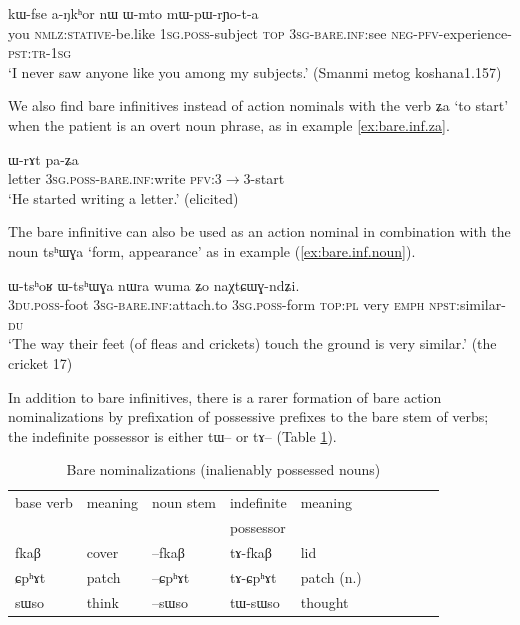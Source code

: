 \documentclass[oldfontcommands,oneside,a4paper,11pt]{article}
\newcommand{\ipa}[1]{{\phon \mbox{#1}}} %
\begin{document}
\begin{exe}
\ex \label{ex:bare.inf}
\gll \ipa{nɤʑo} 	\ipa{kɯ-fse} 	\ipa{a-ŋkʰor} 	\ipa{nɯ} 	\ipa{ɯ-mto} 	\ipa{mɯ-pɯ-rɲo-t-a} \\
you \textsc{nmlz:stative}-be.like \textsc{1sg.poss}-subject \textsc{top} \textsc{3sg}-\textsc{bare.inf:}see \textsc{neg-pfv}-experience-\textsc{pst:tr-1sg} \\
\glt  `I never saw anyone like you among my subjects.' (Smanmi metog koshana1.157)
\end{exe}

We also find bare infinitives instead of action nominals with the verb \ipa{ʑa} `to start' when the patient is an overt noun phrase, as in example \ref{ex:bare.inf.za}.

\begin{exe}
\ex \label{ex:bare.inf.za}
\gll \ipa{tɤscoz} 	\ipa{ɯ-rɤt} 	\ipa{pa-ʑa} 	  \\
letter \textsc{3sg.poss}-\textsc{bare.inf:}write \textsc{pfv:3$\rightarrow$3}-start\\
\glt  `He started writing a letter.' (elicited)
\end{exe}

 
The bare infinitive can also be used as an action nominal in combination with the noun \ipa{tsʰɯɣa} `form, appearance' as in example (\ref{ex:bare.inf.noun}).

\begin{exe}
\ex \label{ex:bare.inf.noun}
\gll \ipa{ndʑi-mi}   	\ipa{ɯ-tsʰoʁ}   	\ipa{ɯ-tsʰɯɣa}   	\ipa{nɯra}   	\ipa{wuma}   	\ipa{ʑo}   	\ipa{naχtɕɯɣ-ndʑi.}   \\
\textsc{3du.poss}-foot \textsc{3sg}-\textsc{bare.inf:}attach.to \textsc{3sg.poss}-form \textsc{top:pl} very \textsc{emph}  \textsc{npst}:similar-\textsc{du}  \\
\glt `The way their feet (of fleas and crickets) touch the ground is very similar.' (the cricket 17)
\end{exe}

In addition to bare infinitives, there is a rarer formation of bare action nominalizations by prefixation of possessive prefixes to the bare stem of verbs; the indefinite possessor is either \ipa{tɯ}-- or \ipa{tɤ}-- (Table \ref{tab:nmlz-inalienably}). 

\begin{table}[H]
\caption{Bare nominalizations (inalienably possessed nouns)} \label{tab:nmlz-inalienably}
\begin{tabular}{llllllllll}
\toprule
base verb & meaning & noun stem & indefinite  & meaning\\
&&&possessor\\
\midrule
\ipa{fkaβ} & cover& \ipa{--fkaβ} & \ipa{tɤ-fkaβ} & lid\\
\ipa{ɕpʰɤt} & patch& \ipa{--ɕpʰɤt} & \ipa{tɤ-ɕpʰɤt} & patch (n.) \\
\ipa{sɯso} & think & \ipa{--sɯso} & \ipa{tɯ-sɯso} & thought \\
\bottomrule
\end{tabular}
\end{table}
\end{document}
